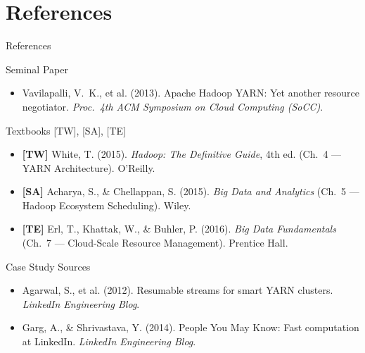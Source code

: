\documentclass[aspectratio=169,10pt]{beamer}
\begin{document}
\section*{References}

\begin{frame}{References}
  \begin{block}{Seminal Paper}
    \begin{itemize}
      \item Vavilapalli, V.~K., et al. (2013).
            Apache Hadoop YARN: Yet another resource negotiator.
            \textit{Proc.\ 4th ACM Symposium on Cloud Computing (SoCC)}.
    \end{itemize}
  \end{block}
  \vspace{4pt}
  \begin{block}{Textbooks \textmd{[TW], [SA], [TE]}}
    \begin{itemize}
      \item \textbf{[TW]} White, T. (2015).
            \textit{Hadoop: The Definitive Guide}, 4th ed.
            (Ch.~4 — YARN Architecture). O'Reilly.
      \item \textbf{[SA]} Acharya, S., \& Chellappan, S. (2015).
            \textit{Big Data and Analytics}
            (Ch.~5 — Hadoop Ecosystem Scheduling). Wiley.
      \item \textbf{[TE]} Erl, T., Khattak, W., \& Buhler, P. (2016).
            \textit{Big Data Fundamentals}
            (Ch.~7 — Cloud-Scale Resource Management). Prentice Hall.
    \end{itemize}
  \end{block}
  \vspace{4pt}
  \begin{block}{Case Study Sources}
    \begin{itemize}
      \item Agarwal, S., et al. (2012).
            Resumable streams for smart YARN clusters.
            \textit{LinkedIn Engineering Blog}.
      \item Garg, A., \& Shrivastava, Y. (2014).
            People You May Know: Fast computation at LinkedIn.
            \textit{LinkedIn Engineering Blog}.
    \end{itemize}
  \end{block}
\end{frame}
\end{document}
